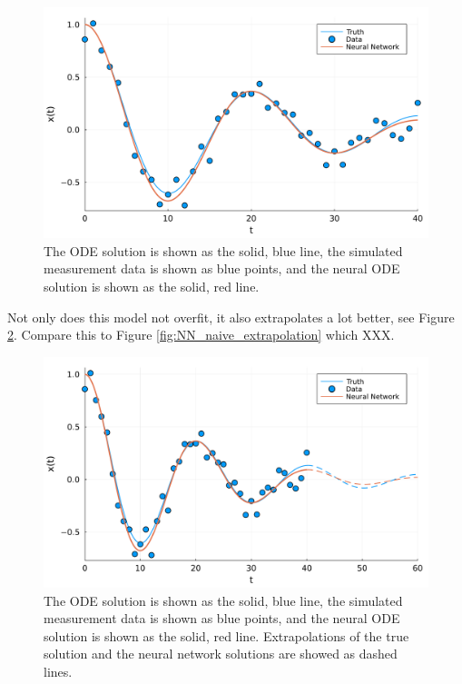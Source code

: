 \documentclass[10pt,a4paper]{article}
\begin{document}
\begin{figure}[H]
    \includegraphics[width=\linewidth]{with_ode.pdf}
    \caption{The ODE solution is shown as the solid, blue line,
        the simulated measurement data is shown as blue points,
        and the neural ODE solution is shown as the solid, red line.}
    \label{fig:NN_ODE}
\end{figure}

Not only does this model not overfit, it also extrapolates a lot better, see Figure \ref{fig:NN_ODE_extrapolation}.
Compare this to Figure \ref{fig:NN_naive_extrapolation} which XXX.

\begin{figure}[H]
    \includegraphics[width=\linewidth]{with_ode_extrapolated.pdf}
    \caption{The ODE solution is shown as the solid, blue line,
        the simulated measurement data is shown as blue points,
        and the neural ODE solution is shown as the solid, red line.
        Extrapolations of the true solution and the neural network solutions are showed as dashed lines.}
    \label{fig:NN_ODE_extrapolation}
\end{figure}
\end{document}
